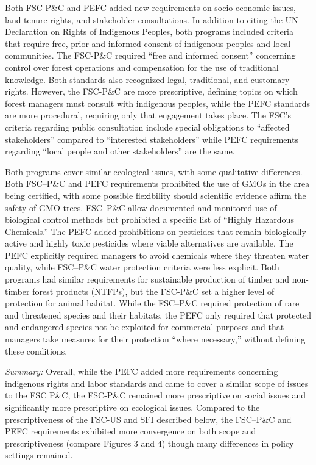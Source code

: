 \documentclass[
      12pt,
            Review ]{article}
\begin{document}
Both FSC-P\&C and PEFC added new requirements on socio-economic issues,
land tenure rights, and stakeholder consultations. In addition to citing
the UN Declaration on Rights of Indigenous Peoples, both programs
included criteria that require free, prior and informed consent of
indigenous peoples and local communities. The FSC-P\&C required ``free
and informed consent'' concerning control over forest operations and
compensation for the use of traditional knowledge. Both standards also
recognized legal, traditional, and customary rights. However, the
FSC-P\&C are more prescriptive, defining topics on which forest managers
must consult with indigenous peoples, while the PEFC standards are more
procedural, requiring only that engagement takes place. The FSC's
criteria regarding public consultation include special obligations to
``affected stakeholders'' compared to ``interested stakeholders'' while
PEFC requirements regarding ``local people and other stakeholders'' are
the same.

Both programs cover similar ecological issues, with some qualitative
differences. Both FSC--P\&C and PEFC requirements prohibited the use of
GMOs in the area being certified, with some possible flexibility should
scientific evidence affirm the safety of GMO trees. FSC--P\&C allow
documented and monitored use of biological control methods but
prohibited a specific list of ``Highly Hazardous Chemicals.'' The PEFC
added prohibitions on pesticides that remain biologically active and
highly toxic pesticides where viable alternatives are available. The
PEFC explicitly required managers to avoid chemicals where they threaten
water quality, while FSC--P\&C water protection criteria were less
explicit. Both programs had similar requirements for sustainable
production of timber and non-timber forest products (NTFPs), but the
FSC-P\&C set a higher level of protection for animal habitat. While the
FSC--P\&C required protection of rare and threatened species and their
habitats, the PEFC only required that protected and endangered species
not be exploited for commercial purposes and that managers take measures
for their protection ``where necessary,'' without defining these
conditions.

\emph{Summary:} Overall, while the PEFC added more requirements
concerning indigenous rights and labor standards and came to cover a
similar scope of issues to the FSC P\&C, the FSC-P\&C remained more
prescriptive on social issues and significantly more prescriptive on
ecological issues. Compared to the prescriptiveness of the FSC-US and
SFI described below, the FSC--P\&C and PEFC requirements exhibited more
convergence on both scope and prescriptiveness (compare Figures 3 and 4)
though many differences in policy settings remained.
\end{document}

